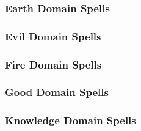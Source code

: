 \subsubsection{Earth Domain Spells}

\begin{spelllist}
    \SLearthenblade[1]
    \SLearthspike[2]
    \SLearthspull[3]
    \SLearthglide[4]
    \SLtransmutefleshandstone[5]
    \SLfissure[6]
    \SLgolemheart[7]
    \SLimprisonment[8]
    \SLearthquake[9]
\end{spelllist}

\subsubsection{Evil Domain Spells}

\begin{spelllist}
    \SLprotectionfromalignment[1]
    \SLcurseofbloodandbone[2]
    \SLunholyblight[3]
    \SLenervation[4]
    \SLblasphemy[5]
    \SLharm[6]
    \SLstriptheflesh[7]
    \SLavatarofsuffering[8]
    \SLunholyavatar[9]
\end{spelllist}

\subsubsection{Fire Domain Spells}

\begin{spelllist}
    \SLburninghands[1]
    \SLwalloffire[2]
    \SLfireball[3]
    \SLfireshield[4]
    \SLflamestrike[5]
    \SLinferno[6]
    \SLimmolation[7]
    \SLfirestorm[8]
    \SLmeteorswarm[9]
\end{spelllist}

\subsubsection{Good Domain Spells}

\begin{spelllist}
    \SLprotectionfromalignment[1]
    \SLsharepain[2]
    \SLholysmite[3]
    \SLavatarofhealing[4]
    \SLholyword[5]
    \SLheal[6]
    \SLdivinejudgment[7]
    \SLmartyrsgift[8]
    \SLholyavatar[9]
\end{spelllist}

\subsubsection{Knowledge Domain Spells}

